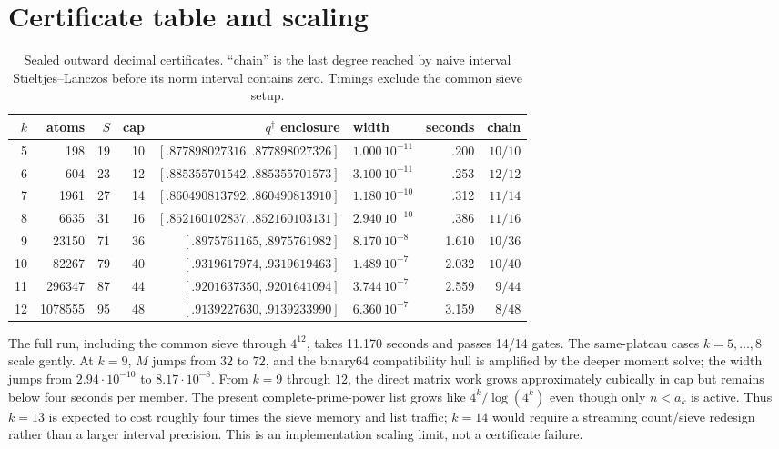 \documentclass[11pt]{article}
\theoremstyle{remark}
\newcommand{\qdag}{q^{\dagger}}
\begin{document}
\section{Certificate table and scaling}

\begin{table}[ht]
\centering
\small
\begin{tabular}{@{}rrrrrlrr@{}}
\toprule
$k$ & atoms & $S$ & cap & $\qdag$ enclosure & width & seconds & chain\\
\midrule
5  & 198     & 19 & 10 & $[.877898027316,.877898027326]$ & $1.000\,10^{-11}$ & .200 & $10/10$\\
6  & 604     & 23 & 12 & $[.885355701542,.885355701573]$ & $3.100\,10^{-11}$ & .253 & $12/12$\\
7  & 1961    & 27 & 14 & $[.860490813792,.860490813910]$ & $1.180\,10^{-10}$ & .312 & $11/14$\\
8  & 6635    & 31 & 16 & $[.852160102837,.852160103131]$ & $2.940\,10^{-10}$ & .386 & $11/16$\\
9  & 23150   & 71 & 36 & $[.8975761165,.8975761982]$     & $8.170\,10^{-8}$  & 1.610 & $10/36$\\
10 & 82267   & 79 & 40 & $[.9319617974,.9319619463]$     & $1.489\,10^{-7}$  & 2.032 & $10/40$\\
11 & 296347  & 87 & 44 & $[.9201637350,.9201641094]$     & $3.744\,10^{-7}$  & 2.559 & $9/44$\\
12 & 1078555 & 95 & 48 & $[.9139227630,.9139233990]$     & $6.360\,10^{-7}$  & 3.159 & $8/48$\\
\bottomrule
\end{tabular}
\caption{Sealed outward decimal certificates.  ``chain'' is the last
degree reached by naive interval Stieltjes--Lanczos before its norm
interval contains zero.  Timings exclude the common sieve setup.}
\label{tab:cert}
\end{table}

The full run, including the common sieve through $4^{12}$, takes
11.170 seconds and passes 14/14 gates.  The same-plateau cases
$k=5,\ldots,8$ scale gently.  At $k=9$, $M$ jumps from $32$ to $72$,
and the binary64 compatibility hull is amplified by the deeper
moment solve; the width jumps from $2.94\cdot10^{-10}$ to
$8.17\cdot10^{-8}$.  From $k=9$ through $12$, the direct matrix work
grows approximately cubically in cap but remains below four seconds
per member.  The present complete-prime-power list grows like
$4^k/\log(4^k)$ even though only $n<a_k$ is active.  Thus $k=13$ is
expected to cost roughly four times the sieve memory and list traffic;
$k=14$ would require a streaming count/sieve redesign rather than a
larger interval precision.  This is an implementation scaling limit,
not a certificate failure.
\end{document}

